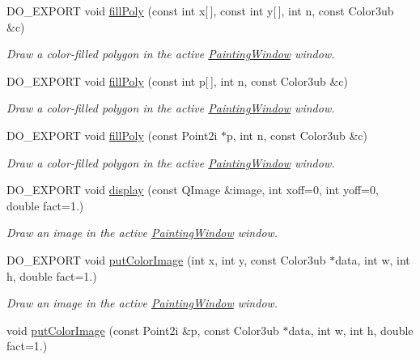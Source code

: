 \begin{DoxyCompactItemize}
D\-O\-\_\-\-E\-X\-P\-O\-R\-T void \hyperlink{group___draw2_d_gaf22fdb89e30d4c6a3dfa955bca0f9d3b}{fill\-Poly} (const int x\mbox{[}$\,$\mbox{]}, const int y\mbox{[}$\,$\mbox{]}, int n, const Color3ub \&c)
\begin{DoxyCompactList}\small\item\em Draw a color-\/filled polygon in the active \hyperlink{class_d_o_1_1_painting_window}{Painting\-Window} window. \end{DoxyCompactList}\item 
D\-O\-\_\-\-E\-X\-P\-O\-R\-T void \hyperlink{group___draw2_d_ga601adc22394b6713b98872874f621179}{fill\-Poly} (const int p\mbox{[}$\,$\mbox{]}, int n, const Color3ub \&c)
\begin{DoxyCompactList}\small\item\em Draw a color-\/filled polygon in the active \hyperlink{class_d_o_1_1_painting_window}{Painting\-Window} window. \end{DoxyCompactList}\item 
D\-O\-\_\-\-E\-X\-P\-O\-R\-T void \hyperlink{group___draw2_d_ga9bce7ee3dfbf9d22449a4cd84ab15b87}{fill\-Poly} (const Point2i $\ast$p, int n, const Color3ub \&c)
\begin{DoxyCompactList}\small\item\em Draw a color-\/filled polygon in the active \hyperlink{class_d_o_1_1_painting_window}{Painting\-Window} window. \end{DoxyCompactList}\item 
D\-O\-\_\-\-E\-X\-P\-O\-R\-T void \hyperlink{group___draw2_d_ga21ef0ec97c68ddfe1610831f9abad05a}{display} (const Q\-Image \&image, int xoff=0, int yoff=0, double fact=1.)
\begin{DoxyCompactList}\small\item\em Draw an image in the active \hyperlink{class_d_o_1_1_painting_window}{Painting\-Window} window. \end{DoxyCompactList}\item 
D\-O\-\_\-\-E\-X\-P\-O\-R\-T void \hyperlink{group___draw2_d_ga88a29cdb7128f7420a377be1a920ad26}{put\-Color\-Image} (int x, int y, const Color3ub $\ast$data, int w, int h, double fact=1.)
\begin{DoxyCompactList}\small\item\em Draw an image in the active \hyperlink{class_d_o_1_1_painting_window}{Painting\-Window} window. \end{DoxyCompactList}\item 
void \hyperlink{group___draw2_d_gad6d58648ab2826b1840c473af1565680}{put\-Color\-Image} (const Point2i \&p, const Color3ub $\ast$data, int w, int h, double fact=1.)

\end{DoxyCompactItemize}
